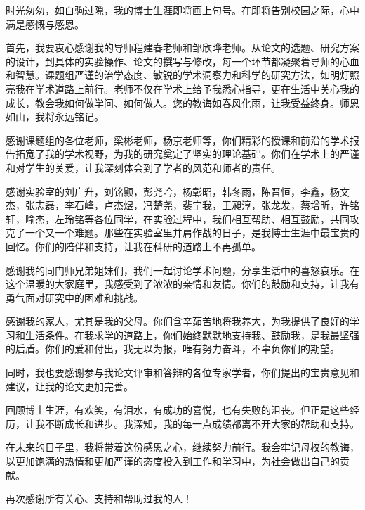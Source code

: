 \documentclass[
    type = doctor,
  ]{njuthesis}
\begin{document}
\begin{acknowledgement}
  时光匆匆，如白驹过隙，我的博士生涯即将画上句号。在即将告别校园之际，心中满是感慨与感恩。
  
  首先，我要衷心感谢我的导师程建春老师和邹欣晔老师。从论文的选题、研究方案的设计，到具体的实验操作、论文的撰写与修改，每一个环节都凝聚着导师的心血和智慧。课题组严谨的治学态度、敏锐的学术洞察力和科学的研究方法，如明灯照亮我在学术道路上前行。老师不仅在学术上给予我悉心指导，更在生活中关心我的成长，教会我如何做学问、如何做人。您的教诲如春风化雨，让我受益终身。师恩如山，我将永远铭记。
  
  感谢课题组的各位老师，梁彬老师，杨京老师等，你们精彩的授课和前沿的学术报告拓宽了我的学术视野，为我的研究奠定了坚实的理论基础。你们在学术上的严谨和对学生的关爱，让我深刻体会到了学者的风范和师者的责任。
  
  感谢实验室的刘广升，刘铭颢，彭尧吟，杨彰昭，韩冬雨，陈晋恒，李鑫，杨文杰，张志磊，李石峰，卢杰煜，冯楚尧，裴宁我，王昶淳，张龙发，蔡增昕，许铭轩，喻杰，左玲铭等各位同学，在实验过程中，我们相互帮助、相互鼓励，共同攻克了一个又一个难题。那些在实验室里并肩作战的日子，是我博士生涯中最宝贵的回忆。你们的陪伴和支持，让我在科研的道路上不再孤单。
  
  感谢我的同门师兄弟姐妹们，我们一起讨论学术问题，分享生活中的喜怒哀乐。在这个温暖的大家庭里，我感受到了浓浓的亲情和友情。你们的鼓励和支持，让我有勇气面对研究中的困难和挑战。
  
  感谢我的家人，尤其是我的父母。你们含辛茹苦地将我养大，为我提供了良好的学习和生活条件。在我求学的道路上，你们始终默默地支持我、鼓励我，是我最坚强的后盾。你们的爱和付出，我无以为报，唯有努力奋斗，不辜负你们的期望。

  
  同时，我也要感谢参与我论文评审和答辩的各位专家学者，你们提出的宝贵意见和建议，让我的论文更加完善。
  
  回顾博士生涯，有欢笑，有泪水，有成功的喜悦，也有失败的沮丧。但正是这些经历，让我不断成长和进步。我深知，我的每一点成绩都离不开大家的帮助和支持。
  
  在未来的日子里，我将带着这份感恩之心，继续努力前行。我会牢记母校的教诲，以更加饱满的热情和更加严谨的态度投入到工作和学习中，为社会做出自己的贡献。
  
  再次感谢所有关心、支持和帮助过我的人！ 
\end{acknowledgement}


{
}



\end{document}
